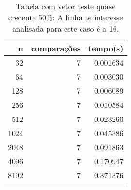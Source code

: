 \begin{table}[ht]
\centering
\begin{tabular}{rrr} \toprule
        n &    comparações &       tempo(s) \\ \midrule
      32  &              7 &      0.001634 \\
      64  &              7 &      0.003030 \\
     128  &              7 &      0.006089 \\
     256  &              7 &      0.010584 \\
     512  &              7 &      0.023260 \\
    1024  &              7 &      0.045386 \\
    2048  &              7 &      0.091863 \\
    4096  &              7 &      0.170947 \\
    8192  &              7 &      0.371376 \\
\bottomrule\addlinespace
\end{tabular}
\caption{Tabela com vetor teste quase crecente 50\%: A linha te interesse analisada para este caso é a 16.}
\label{tab:radixsortQuaseCresc50}
\end{table}
